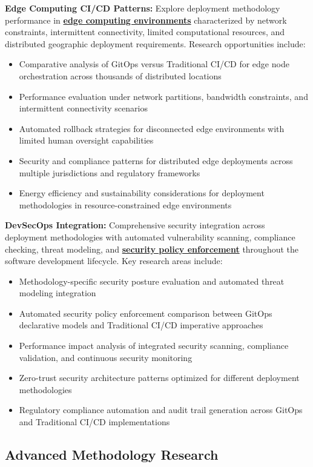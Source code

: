 \textbf{Edge Computing CI/CD Patterns:} Explore deployment methodology performance in \textbf{\hyperref[edge_computing]{edge computing environments}} characterized by network constraints, intermittent connectivity, limited computational resources, and distributed geographic deployment requirements. Research opportunities include:
\begin{itemize}
\item Comparative analysis of GitOps versus Traditional CI/CD for edge node orchestration across thousands of distributed locations
\item Performance evaluation under network partitions, bandwidth constraints, and intermittent connectivity scenarios
\item Automated rollback strategies for disconnected edge environments with limited human oversight capabilities
\item Security and compliance patterns for distributed edge deployments across multiple jurisdictions and regulatory frameworks
\item Energy efficiency and sustainability considerations for deployment methodologies in resource-constrained edge environments
\end{itemize}

\textbf{DevSecOps Integration:} Comprehensive security integration across deployment methodologies with automated vulnerability scanning, compliance checking, threat modeling, and \textbf{\hyperref[devsecops]{security policy enforcement}} throughout the software development lifecycle. Key research areas include:
\begin{itemize}
\item Methodology-specific security posture evaluation and automated threat modeling integration
\item Automated security policy enforcement comparison between GitOps declarative models and Traditional CI/CD imperative approaches
\item Performance impact analysis of integrated security scanning, compliance validation, and continuous security monitoring
\item Zero-trust security architecture patterns optimized for different deployment methodologies
\item Regulatory compliance automation and audit trail generation across GitOps and Traditional CI/CD implementations
\end{itemize}

\subsection{Advanced Methodology Research}
\label{subsec:advanced_methodology}

